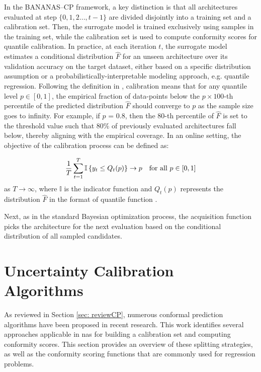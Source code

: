 {{In the BANANAS--CP framework, a key distinction is that all architectures evaluated at step $\{0, 1, 2..., t-1\}$ are divided disjointly into a training set and a calibration set. Then, the surrogate model is trained exclusively using samples in the training set, while the calibration set is used to compute conformity scores for quantile calibration. In practice, at each iteration $t$, the surrogate model estimates a conditional distribution $\hat{F}$ for an unseen architecture over its validation accuracy on the target dataset, either based on a specific distribution assumption or a probabilistically-interpretable modeling approach, e.g. quantile regression. Following the definition in \cite{deshpande2024online, pmlr-v80-kuleshov18a}, calibration means that for any quantile level $p\in [0, 1]$, the empirical fraction of data-points below the $p \times 100$-th percentile of the predicted distribution $\hat{F}$ should converge to $p$ as the sample size goes to infinity. For example, if $p$ = 0.8, then the 80-th percentile of $\hat{F}$ is set to the threshold value such that 80\% of previously evaluated architectures fall below, thereby aligning with the empirical coverage. In an online setting, the objective of the calibration process can be defined as:

\begin{equation}
\frac{1}{T} \sum_{t=1}^{T} \mathbb{I} \left\{ y_t \leq Q_t(p) \right\} \rightarrow p \quad \text{for all } p \in [0,1]
\vspace{1em}
\end{equation}
as $T \rightarrow \infty$, where $\mathbb{I}$ is the indicator function and $Q_t(p)$ represents the distribution $\hat{F}$ in the format of quantile function \cite{deshpande2024online, pmlr-v80-kuleshov18a}. 

Next, as in the standard  Bayesian optimization process, the acquisition function picks the architecture for the next evaluation based on the conditional distribution of all sampled candidates.

\section{Uncertainty Calibration Algorithms}
\label{sec:cp}
As reviewed in Section \ref{sec: reviewCP}, numerous conformal prediction algorithms have been proposed in recent research. This work identifies several approaches applicable in \gls{nas} for building a calibration set and computing conformity scores. This section provides an overview of these splitting strategies, as well as the conformity scoring functions that are commonly used for regression problems.

}}
